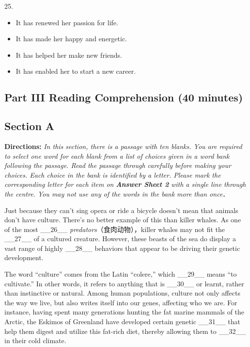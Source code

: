 \documentclass[UTF8,11pt]{ctexart}
\begin{document}
25.


\begin{itemize}[leftmargin=2em,itemsep=.2em,topsep=.4em]\item[A.] It has renewed her passion for life.
\item[B.] It has made her happy and energetic.
\item[C.] It has helped her make new friends.
\item[D.] It has enabled her to start a new career.
\end{itemize}

\subsection*{\textbf{Part III} \textbf{Reading Comprehension} \textbf{(40 minutes)}}


\subsection*{\textbf{Section A}}


\textbf{Directions:}\textit{ In this section, there is a passage with ten blanks. You are required to select one word for each blank} \textit{from a list of choices given in a word bank following the passage. Read the passage through carefully before} \textit{making your choices. Each choice in the bank is identified by a letter. Please mark the corresponding letter for} \textit{each item on}\textbf{\textit{ Answer Sheet 2}}\textit{ with a single line through the centre. You may not use any of the words in the bank} \textit{more than once}．


Just because they can’t sing opera or ride a bicycle doesn’t mean that animals don’t have culture. There’s no better example of this than killer whales. As one of the most \_\_26\_\_\textit{ predators}（食肉动物），killer whales may not fit the \_\_27\_\_ of a cultured creature. However, these beasts of the sea do display a vast range of highly \_\_28\_\_ behaviors that appear to be driving their genetic development.


The word “culture” comes from the Latin “colere,” which \_\_29\_\_ means “to cultivate.” In other words, it refers to anything that is \_\_30\_\_ or learnt, rather than instinctive or natural. Among human populations, culture not only affects the way we live, but also writes itself into our genes, affecting who we are. For instance, having spent many generations hunting the fat marine mammals of the Arctic, the Eskimos of Greenland have developed certain genetic \_\_31\_\_ that help them digest and utilize this fat-rich diet, thereby allowing them to \_\_32\_\_ in their cold climate.
\end{document}
